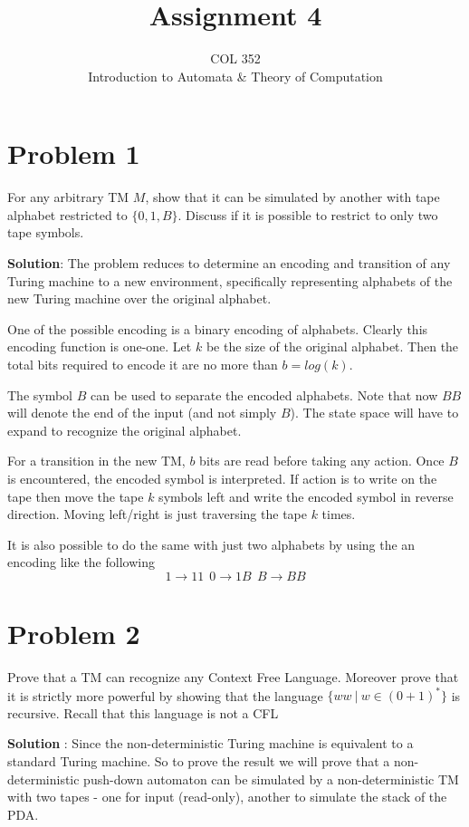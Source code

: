 \documentclass{article}
\title{Assignment 4}
\author{COL 352\\
    Introduction to Automata \& 
    Theory of Computation}
\date{}
\begin{document}
    \maketitle
    
    \section*{Problem 1} For any arbitrary TM $M$, show that it can be simulated by another with tape alphabet restricted to $\{0, 1, B\}$. Discuss if it is possible to restrict to only two tape symbols.
    
    \textbf{Solution}: The problem reduces to determine an encoding and transition of any Turing machine to a new environment, specifically representing alphabets of the new Turing machine over the original alphabet. 
    
    One of the possible encoding is a binary encoding of alphabets. Clearly this encoding function is one-one. 
    Let $k$ be the size of the original alphabet. Then the total bits required to encode it are no more than $b = log(k)$. 
    
    The symbol $B$ can be used to separate the encoded alphabets. Note that now $BB$ will denote the end of the input (and not simply $B$).
    The state space will have to expand to recognize the original alphabet.
    
    For a transition in the new TM, $b$ bits are read before taking any action. Once $B$ is encountered, the encoded symbol is interpreted. If action is to write on the tape then move the tape $k$ symbols left and write the encoded symbol in reverse direction. Moving left/right is just traversing the tape $k$ times.

    It is also possible to do the same with just two alphabets by using the an encoding like the following
    $$1 \rightarrow 11~  ~0 \rightarrow 1B~  ~B \rightarrow BB$$
    
    
    \section*{Problem 2} Prove that a TM can recognize any Context Free Language.  Moreover prove that it is strictly more powerful by showing that the language $\{ww ~|~ w \in (0 + 1)^* \}$ is recursive. Recall that this language is not a CFL
    
    \textbf{Solution} : Since the non-deterministic Turing machine is equivalent to a standard Turing machine. So to prove the result we will prove that a non-deterministic push-down automaton can be simulated by a non-deterministic TM with two tapes - one for input (read-only), another to simulate the stack of the PDA.
    
\end{document}
